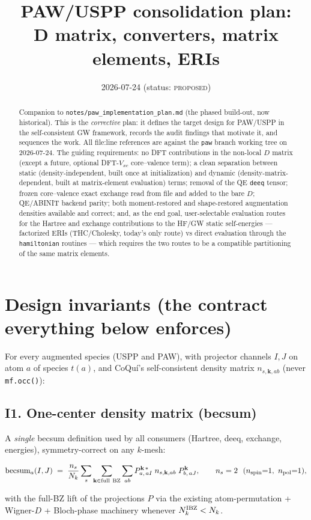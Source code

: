 \documentclass[11pt]{article}
\title{\bfseries PAW/USPP consolidation plan:\\
D matrix, converters, matrix elements, ERIs}
\author{}
\date{2026-07-24 \quad (status: \textsc{proposed})}
\newcommand{\code}[1]{\texttt{\small #1}}
\newcommand{\file}[1]{\texttt{\small #1}}
\newcommand{\becsum}{\mathrm{becsum}}
\begin{document}
\maketitle

\begin{abstract}
\noindent
Companion to \file{notes/paw\_implementation\_plan.md} (the phased build-out,
now historical). This is the \emph{corrective} plan: it defines the target
design for PAW/USPP in the self-consistent GW framework, records the audit
findings that motivate it, and sequences the work. All file:line references
are against the \code{paw} branch working tree on 2026-07-24. The guiding
requirements: no DFT contributions in the non-local $D$ matrix (except a
future, optional DFT-$V_{xc}$ core--valence term); a clean separation between
static (density-independent, built once at initialization) and dynamic
(density-matrix-dependent, built at matrix-element evaluation) terms; removal
of the QE \code{deeq} tensor; frozen core--valence exact exchange read from
file and added to the bare $D$; QE/ABINIT backend parity; both
moment-restored and shape-restored augmentation densities available and
correct; and, as the end goal, user-selectable evaluation routes for the
Hartree and exchange contributions to the HF/GW static self-energies ---
factorized ERIs (THC/Cholesky, today's only route) vs direct evaluation
through the \code{hamiltonian} routines --- which requires the two routes to
be a compatible partitioning of the same matrix elements.
\end{abstract}

\tableofcontents

\section{Design invariants (the contract everything below enforces)}
\label{sec:invariants}

For every augmented species (USPP and PAW), with projector channels $I,J$ on
atom $a$ of species $t(a)$, and CoQu\'i's self-consistent density matrix
$n_{s,\mathbf{k},ab}$ (never \code{mf.occ()}):

\subsection*{I1. One-center density matrix (becsum)}

A \emph{single} becsum definition used by all consumers (Hartree, deeq,
exchange, energies), symmetry-correct on any $k$-mesh:
\begin{keybox}
\begin{equation}
\becsum_a(I,J) \;=\; \frac{n_s}{N_k}
\sum_{s}\sum_{\mathbf{k}\in\mathrm{full\ BZ}}\sum_{ab}
P^{\mathbf{k}\,*}_{a,\,aI}\; n_{s,\mathbf{k},ab}\; P^{\mathbf{k}}_{b,\,aJ},
\qquad n_s = 2 \ \ (n_{\rm spin}{=}1,\ n_{\rm pol}{=}1),
\label{eq:becsum}
\end{equation}
\end{keybox}
with the full-BZ lift of the projections $P$ via the existing
atom-permutation + Wigner-$D$ + Bloch-phase machinery whenever
$N_k^{\rm IBZ} < N_k$.
\end{document}
